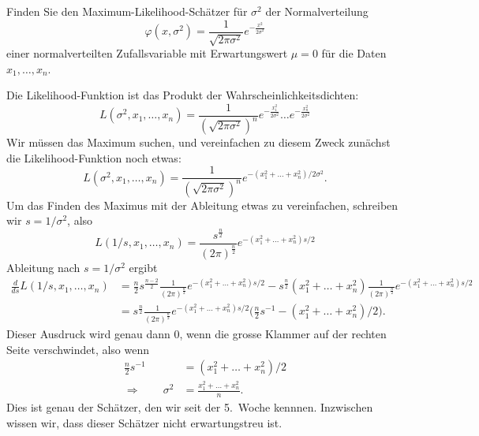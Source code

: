 Finden Sie den Maximum-Likelihood-Schätzer für $\sigma^2$ der Normalverteilung
\[
\varphi(x,\sigma^2)
= 
\frac1{\sqrt{2\pi \sigma^2}} e^{-\frac{x^2}{2\sigma^2}}
\]
einer normalverteilten Zufallsvariable mit Erwartungswert $\mu=0$ für die
Daten $x_1,\dots,x_n$.

\begin{loesung}
Die Likelihood-Funktion ist das Produkt der Wahrscheinlichkeitsdichten:
\[
L(\sigma^2,x_1,\dots,x_n)
=
\frac1{(\sqrt{2\pi \sigma^2})^n}
e^{-\frac{x_1^2}{2\sigma^2}}
\dots
e^{-\frac{x_n^2}{2\sigma^2}}
\]
Wir müssen das Maximum suchen, und vereinfachen zu diesem Zweck zunächst
die Likelihood-Funktion noch etwas:
\[
L(\sigma^2,x_1,\dots,x_n)
=
\frac1{(\sqrt{2\pi \sigma^2})^n}
e^{-(x_1^2+\dots+x_n^2)/2\sigma^2}.
\]
Um das Finden des Maximus mit der Ableitung etwas zu vereinfachen,
schreiben wir $s=1/\sigma^2$, also
\[
L(1/s,x_1,\dots,x_n)
=
\frac{s^{\frac{n}2}}{(2\pi)^{\frac{n}2}}
e^{-(x_1^2+\dots+x_n^2)s/2}
\]
Ableitung nach $s=1/\sigma^2$ ergibt
\begin{align*}
\frac{d}{ds}
L(1/s,x_1,\dots,x_n)
&=
\frac{n}2s^{\frac{n-2}2}
\frac1{(2\pi)^{\frac{n}2}}
e^{-(x_1^2+\dots+x_n^2)s/2}
-
s^{\frac{n}2}
(x_1^2+\dots+x_n^2)
\frac1{(2\pi)^{\frac{n}2}}
e^{-(x_1^2+\dots+x_n^2)s/2}
\\
&=
s^{\frac{n}2}
\frac1{(2\pi)^{\frac{n}2}}
e^{-(x_1^2+\dots+x_n^2)s/2}
\biggl(
\frac{n}2
s^{-1}
-
(x_1^2+\dots+x_n^2)/2
\biggr).
\end{align*}
Dieser Ausdruck wird genau dann $0$, wenn die grosse Klammer auf der
rechten Seite verschwindet, also wenn
\begin{align*}
\frac{n}2
s^{-1}
&=
(x_1^2+\dots+x_n^2)/2
\\
\Rightarrow\qquad
\sigma^2
&=
\frac{x_1^2+\dots+x_n^2}n.
\end{align*}
Dies ist genau der Schätzer, den wir seit der 5.~Woche kennnen.
Inzwischen wissen wir, dass dieser Schätzer nicht erwartungstreu ist.
\end{loesung}



